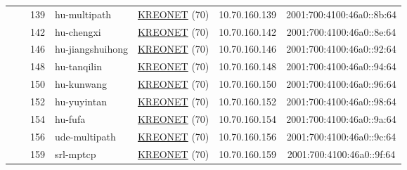 \begin{small}
\begin{center}
\begin{longtable}{|c|c|c|c|c|c|c|c|}
  &  & \tiny{139} & \multicolumn{1}{|l|}{\tiny{hu-multipath}} & \multicolumn{2}{|c|}{\tiny{\href{http://www.kreonet.net}{KREONET} (70)}} & \tiny{10.70.160.139} & \tiny{2001:700:4100:46a0::8b:64} \\* \cline{3-3}\cline{4-4}\cline{5-5}\cline{6-6}\cline{7-7}\cline{8-8}
  &  & \tiny{142} & \multicolumn{1}{|l|}{\tiny{hu-chengxi}} & \multicolumn{2}{|c|}{\tiny{\href{http://www.kreonet.net}{KREONET} (70)}} & \tiny{10.70.160.142} & \tiny{2001:700:4100:46a0::8e:64} \\* \cline{3-3}\cline{4-4}\cline{5-5}\cline{6-6}\cline{7-7}\cline{8-8}
  &  & \tiny{146} & \multicolumn{1}{|l|}{\tiny{hu-jiangshuihong}} & \multicolumn{2}{|c|}{\tiny{\href{http://www.kreonet.net}{KREONET} (70)}} & \tiny{10.70.160.146} & \tiny{2001:700:4100:46a0::92:64} \\* \cline{3-3}\cline{4-4}\cline{5-5}\cline{6-6}\cline{7-7}\cline{8-8}
  &  & \tiny{148} & \multicolumn{1}{|l|}{\tiny{hu-tanqilin}} & \multicolumn{2}{|c|}{\tiny{\href{http://www.kreonet.net}{KREONET} (70)}} & \tiny{10.70.160.148} & \tiny{2001:700:4100:46a0::94:64} \\* \cline{3-3}\cline{4-4}\cline{5-5}\cline{6-6}\cline{7-7}\cline{8-8}
  &  & \tiny{150} & \multicolumn{1}{|l|}{\tiny{hu-kunwang}} & \multicolumn{2}{|c|}{\tiny{\href{http://www.kreonet.net}{KREONET} (70)}} & \tiny{10.70.160.150} & \tiny{2001:700:4100:46a0::96:64} \\* \cline{3-3}\cline{4-4}\cline{5-5}\cline{6-6}\cline{7-7}\cline{8-8}
  &  & \tiny{152} & \multicolumn{1}{|l|}{\tiny{hu-yuyintan}} & \multicolumn{2}{|c|}{\tiny{\href{http://www.kreonet.net}{KREONET} (70)}} & \tiny{10.70.160.152} & \tiny{2001:700:4100:46a0::98:64} \\* \cline{3-3}\cline{4-4}\cline{5-5}\cline{6-6}\cline{7-7}\cline{8-8}
  &  & \tiny{154} & \multicolumn{1}{|l|}{\tiny{hu-fufa}} & \multicolumn{2}{|c|}{\tiny{\href{http://www.kreonet.net}{KREONET} (70)}} & \tiny{10.70.160.154} & \tiny{2001:700:4100:46a0::9a:64} \\* \cline{3-3}\cline{4-4}\cline{5-5}\cline{6-6}\cline{7-7}\cline{8-8}
  &  & \tiny{156} & \multicolumn{1}{|l|}{\tiny{ude-multipath}} & \multicolumn{2}{|c|}{\tiny{\href{http://www.kreonet.net}{KREONET} (70)}} & \tiny{10.70.160.156} & \tiny{2001:700:4100:46a0::9c:64} \\* \cline{3-3}\cline{4-4}\cline{5-5}\cline{6-6}\cline{7-7}\cline{8-8}
  &  & \tiny{159} & \multicolumn{1}{|l|}{\tiny{srl-mptcp}} & \multicolumn{2}{|c|}{\tiny{\href{http://www.kreonet.net}{KREONET} (70)}} & \tiny{10.70.160.159} & \tiny{2001:700:4100:46a0::9f:64} \\* \cline{3-3}\cline{4-4}\cline{5-5}\cline{6-6}\cline{7-7}\cline{8-8}

\end{longtable}
\end{center}
\end{small}
